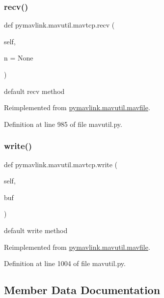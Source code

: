\subsubsection{\texorpdfstring{recv()}{recv()}}
{\footnotesize\ttfamily def pymavlink.\+mavutil.\+mavtcp.\+recv (\begin{DoxyParamCaption}\item[{}]{self,  }\item[{}]{n = {\ttfamily None} }\end{DoxyParamCaption})}

\begin{DoxyVerb}default recv method\end{DoxyVerb}
 

Reimplemented from \mbox{\hyperlink{classpymavlink_1_1mavutil_1_1mavfile_a09cb800fc6b03949ace05ce320539be2}{pymavlink.\+mavutil.\+mavfile}}.



Definition at line 985 of file mavutil.\+py.

\mbox{\label{classpymavlink_1_1mavutil_1_1mavtcp_abcc941efee4231016584e06c7cf07590}} 
\subsubsection{\texorpdfstring{write()}{write()}}
{\footnotesize\ttfamily def pymavlink.\+mavutil.\+mavtcp.\+write (\begin{DoxyParamCaption}\item[{}]{self,  }\item[{}]{buf }\end{DoxyParamCaption})}

\begin{DoxyVerb}default write method\end{DoxyVerb}
 

Reimplemented from \mbox{\hyperlink{classpymavlink_1_1mavutil_1_1mavfile_a8f40348c156083384c07dfa73cf92a62}{pymavlink.\+mavutil.\+mavfile}}.



Definition at line 1004 of file mavutil.\+py.



\subsection{Member Data Documentation}
\mbox{\label{classpymavlink_1_1mavutil_1_1mavtcp_adbcfafdf4396034a93ede2fb765a0a7c}} 
